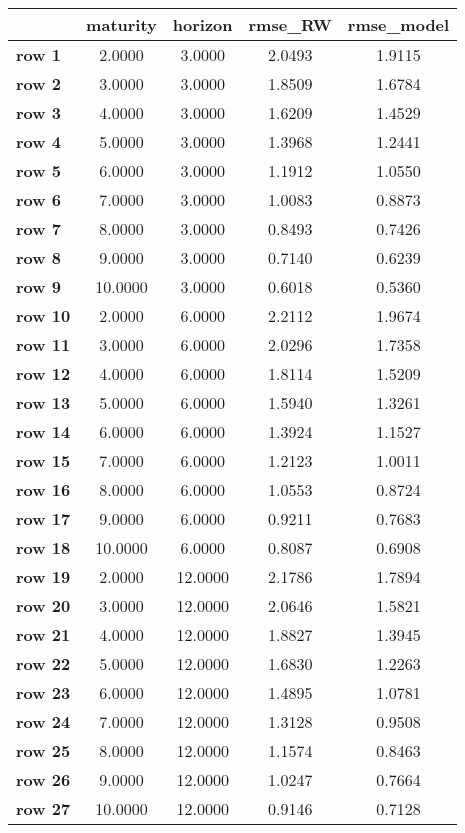 \begin{tiny}\begin{tabular}{|l|c|c|c|c|}
\hline
&\textbf{maturity}&\textbf{horizon}&\textbf{rmse_RW}&\textbf{rmse_model}\\\hline
\textbf{row 1}&2.0000&3.0000&2.0493&1.9115\\\hline
\textbf{row 2}&3.0000&3.0000&1.8509&1.6784\\\hline
\textbf{row 3}&4.0000&3.0000&1.6209&1.4529\\\hline
\textbf{row 4}&5.0000&3.0000&1.3968&1.2441\\\hline
\textbf{row 5}&6.0000&3.0000&1.1912&1.0550\\\hline
\textbf{row 6}&7.0000&3.0000&1.0083&0.8873\\\hline
\textbf{row 7}&8.0000&3.0000&0.8493&0.7426\\\hline
\textbf{row 8}&9.0000&3.0000&0.7140&0.6239\\\hline
\textbf{row 9}&10.0000&3.0000&0.6018&0.5360\\\hline
\textbf{row 10}&2.0000&6.0000&2.2112&1.9674\\\hline
\textbf{row 11}&3.0000&6.0000&2.0296&1.7358\\\hline
\textbf{row 12}&4.0000&6.0000&1.8114&1.5209\\\hline
\textbf{row 13}&5.0000&6.0000&1.5940&1.3261\\\hline
\textbf{row 14}&6.0000&6.0000&1.3924&1.1527\\\hline
\textbf{row 15}&7.0000&6.0000&1.2123&1.0011\\\hline
\textbf{row 16}&8.0000&6.0000&1.0553&0.8724\\\hline
\textbf{row 17}&9.0000&6.0000&0.9211&0.7683\\\hline
\textbf{row 18}&10.0000&6.0000&0.8087&0.6908\\\hline
\textbf{row 19}&2.0000&12.0000&2.1786&1.7894\\\hline
\textbf{row 20}&3.0000&12.0000&2.0646&1.5821\\\hline
\textbf{row 21}&4.0000&12.0000&1.8827&1.3945\\\hline
\textbf{row 22}&5.0000&12.0000&1.6830&1.2263\\\hline
\textbf{row 23}&6.0000&12.0000&1.4895&1.0781\\\hline
\textbf{row 24}&7.0000&12.0000&1.3128&0.9508\\\hline
\textbf{row 25}&8.0000&12.0000&1.1574&0.8463\\\hline
\textbf{row 26}&9.0000&12.0000&1.0247&0.7664\\\hline
\textbf{row 27}&10.0000&12.0000&0.9146&0.7128\\\hline
\end{tabular}
\end{tiny}